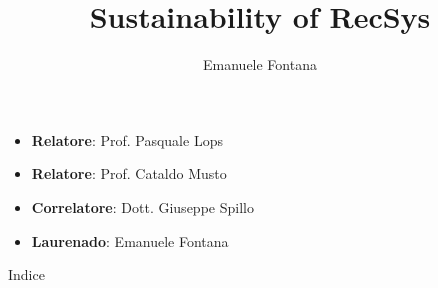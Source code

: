 \documentclass[aspectratio=169,xcolor=dvipsnames, t]{beamer}
\title[full title]{Sustainability of RecSys}
\author{Emanuele Fontana}
\institute[]{Università degli Studi di Bari Aldo Moro}
\date{}
\begin{document}
\maketitlepage
\begin{frame}[t]{}
    \begin{itemize}
        \item \textbf{Relatore}: Prof. Pasquale Lops
        \item \textbf{Relatore}: Prof. Cataldo Musto
        \item \textbf{Correlatore}: Dott. Giuseppe Spillo
        \item \textbf{Laurenado}: Emanuele Fontana
    \end{itemize}
\end{frame}



\begin{frame}[t]{Indice}
    \tableofcontents
\end{frame}









\makefinalpage
\end{document}
